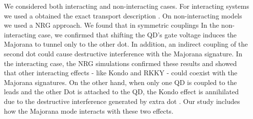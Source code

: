 \documentclass[showpacs,aps,prb,reprint,superscriptaddress]{revtex4-1}
\begin{document}
 
  We  considered both interacting and non-interacting cases. For interacting systems we used a obtained the exact transport description . On non-interacting models we used a NRG approach.   We found that in symmetric couplings  In the non-interacting case, we confirmed that shifting the QD’s gate voltage induces the Majorana to tunnel only to the other dot. In addition, an indirect coupling of the second dot could cause destructive interference with the Majorana signature. In the interacting case,  the NRG simulations confirmed these results and showed that other interacting effects - like Kondo and RKKY \cite{ruderman_indirect_1954,kasuya_theory_1956,yosida_magnetic_1957} - could coexist with the Majorana signatures. On the other hand, when only one QD is coupled to the leads and the other Dot is attached to the QD,  the Kondo effect is annihilated due to the destructive interference  generated by extra dot \cite{dias_da_silva_transmission_2008}. Our study includes how the Majorana mode interacts with these two effects.  
 
 





\end{document}
